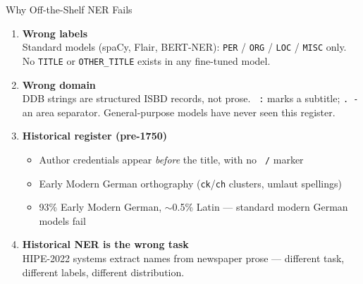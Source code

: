 \documentclass[xcolor,aspectratio=169,compress]{beamer}
\begin{document}
\begin{frame}{Why Off-the-Shelf NER Fails}
  \small
  \begin{enumerate}\setlength{\itemsep}{4pt}
    \item \textbf{Wrong labels} \\
          Standard models (spaCy, Flair, BERT-NER): \texttt{PER} / \texttt{ORG} / \texttt{LOC} / \texttt{MISC} only.
          No \texttt{TITLE} or \texttt{OTHER\_TITLE} exists in any fine-tuned model.

    \item \textbf{Wrong domain} \\
          DDB strings are structured ISBD records, not prose.
          \texttt{ :} marks a subtitle; \texttt{. -} an area separator.
          General-purpose models have never seen this register.

    \item \textbf{Historical register (pre-1750)}
          \begin{itemize}\setlength{\itemsep}{1pt}
            \item Author credentials appear \emph{before} the title, with no \texttt{ /} marker
            \item Early Modern German orthography (\texttt{ck}/\texttt{ch} clusters, umlaut spellings)
            \item 93\% Early Modern German, $\sim$0.5\% Latin --- standard modern German models fail
          \end{itemize}

    \item \textbf{Historical NER is the wrong task} \\
          HIPE-2022 systems extract names from newspaper prose ---
          different task, different labels, different distribution.
  \end{enumerate}
\end{frame}

\end{document}
